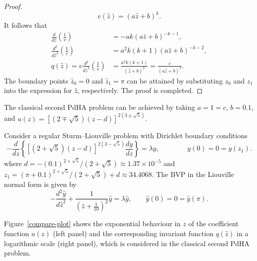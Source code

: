 \documentclass[symmetry,article,accept,moreauthors,pdftex,a4paper]{mdpi}
\begin{document}
\begin{paracol}{2}
\begin{proof}
\begin{equation*}
v(\widehat{z}) = \left(a\widehat{z} + b\right)^{k}.
\end{equation*}
It follows that
\begin{align*}
\frac{d}{d\widehat{z}} \left(\frac{1}{v} \right) &= -a k \left(a\widehat{z} + b\right)^{-k - 1}, \\
\frac{d^2}{d\widehat{z}^2} \left(\frac{1}{v} \right) &= a^2 k(k + 1) \left(a\widehat{z} + b\right)^{-k - 2}, \\
q(\widehat{z}) = v \frac{d^2}{d\widehat{z}^2} \left(\frac{1}{v} \right) &= \frac{a^2 k(k + 1)}{\left(\widehat{z} + b\right)^2} = \frac{c}{\left(a\widehat{z} + b\right)^2}.
\end{align*}
The boundary points $\widehat{z}_0 = 0$ and $\widehat{z}_1 = \pi$ can be attained by substituting $z_0$ and $z_1$ into the expression for $\widehat{z}$, respectively. The proof is completed. \hfill {\qquad}
\end{proof}

\begin{Corollary}
The classical second PdHA problem can be achieved by taking $a = 1 = c$, $b = 0.1$, and $u(z) = \left[(2 \mp \sqrt{5})(z - d)\right]^{2(3 \pm \sqrt{5})}$.
\end{Corollary}

\begin{Example}
Consider a regular Sturm--Liouville problem with Dirichlet boundary conditions 
\begin{equation*}
-\frac{d}{dz} \left\{ \left[\left(2 + \sqrt{5} \right)(z - d)\right]^{2(3 - \sqrt{5})} \frac{dy}{dz} \right\} = \lambda y, \qquad \qquad y(0) = 0 = y(z_1). 
\end{equation*}
where $d = -(0.1)^{2 + \sqrt{5}}/(2 + \sqrt{5}) \approx 1.37 \times 10^{-5}$ and $z_1 = (\pi + 0.1)^{2 + \sqrt{5}}/(2 + \sqrt{5}) + d \approx 34.4068$.
The BVP in the Liouville normal form is given by
\begin{equation*}
-\frac{d^2\widehat{y}}{d\widehat{z}^2} + \frac{1}{\left(\widehat{z} + \frac{1}{10} \right)^2} \widehat{y} = \lambda \widehat{y}, \qquad 
\widehat{y}(0) = 0 = \widehat{y}(\pi).
\end{equation*}
\end{Example} 
Figure~\ref{compare-plot} shows the exponential behaviour in $z$ of the coefficient function $u(z)$ (left panel) and the corresponding invariant function $q(\widehat{z})$ in a logarithmic scale (right panel), which is considered in the classical second PdHA problem.

\clearpage
\end{paracol}
\end{document}
